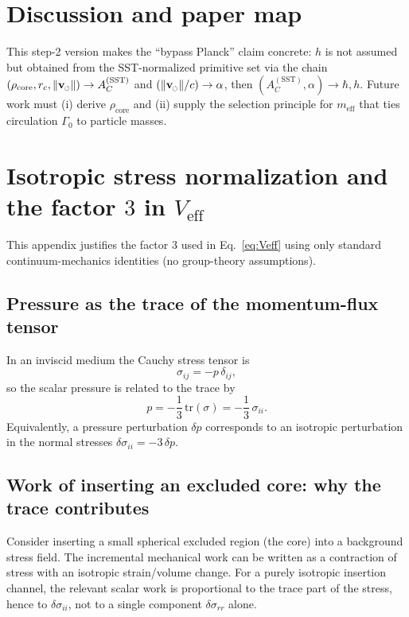 \documentclass[pdflatex,sn-mathphys-num]{revtex4-2}
\newcommand{\swirlarrow}{\mathchoice{\mkern-2mu\scriptstyle\boldsymbol{\circlearrowleft}}{\mkern-2mu\scriptstyle\boldsymbol{\circlearrowleft}}{\mkern-2mu\scriptscriptstyle\boldsymbol{\circlearrowleft}}{\mkern-2mu\scriptscriptstyle\boldsymbol{\circlearrowleft}}}
\newcommand{\rhocore}{\rho_{\text{core}}}
\newcommand{\vswirl}{\mathbf{v}_{\swirlarrow}}
\newcommand{\vnorm}{\lVert \vswirl \rVert}
\providecommand{\rc}{r_c}
\newcommand{\clight}{c}
\begin{document}
    \section{Discussion and paper map}
    This step-2 version makes the ``bypass Planck'' claim concrete:
    \(h\) is not assumed but obtained from the SST-normalized primitive set via the chain
    \((\rhocore,\rc,\vnorm)\to A_C^{\mathrm{(SST)}}\) and \((\vnorm/\clight)\to \alpha\), then \((A_C^{\mathrm{(SST)}},\alpha)\to \hbar,h\).
    Future work must (i) derive \(\rhocore\) and (ii) supply the selection principle for \(m_{\text{eff}}\)
    that ties circulation \(\Gamma_0\) to particle masses.

    \appendix
    \section{Isotropic stress normalization and the factor \(3\) in \(V_{\text{eff}}\)}
    \label{app:isotropic3}

    This appendix justifies the factor \(3\) used in Eq.~\eqref{eq:Veff} using only standard continuum-mechanics
    identities (no group-theory assumptions).

    \subsection{Pressure as the trace of the momentum-flux tensor}
        In an inviscid medium the Cauchy stress tensor is
        \begin{equation}
            \sigma_{ij} = -p\,\delta_{ij},
        \end{equation}
        so the scalar pressure is related to the trace by
        \begin{equation}
            p = -\frac{1}{3}\,\mathrm{tr}(\sigma) = -\frac{1}{3}\,\sigma_{ii}.
            \label{eq:p_trace}
        \end{equation}
        Equivalently, a pressure perturbation \(\delta p\) corresponds to an isotropic perturbation in the normal stresses
        \(\delta\sigma_{ii}=-3\,\delta p\).

    \subsection{Work of inserting an excluded core: why the trace contributes}
        Consider inserting a small spherical excluded region (the core) into a background stress field.
        The incremental mechanical work can be written as a contraction of stress with an isotropic strain/volume change.
        For a purely isotropic insertion channel, the relevant scalar work is proportional to the trace part of the stress,
        hence to \(\delta\sigma_{ii}\), not to a single component \(\delta\sigma_{rr}\) alone.
\end{document}
